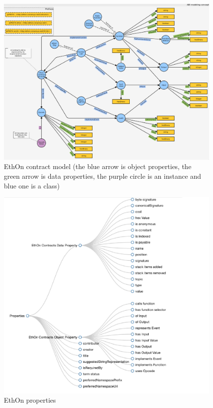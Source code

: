 \begin{center}
	
	\begin{figure}[htb!]
		
		\begin{minipage}{0.50\linewidth}
			\centering
			\includegraphics[width=1.80\textwidth]{images/chap2_EthOnContract.png}
		\end{minipage}
		\caption[EthOn classes]{EthOn contract model (the blue arrow is object properties, the green arrow is data properties, the purple circle is an instance and blue one is a class) \cite{Rashid}}
		
	\end{figure}
	
	\begin{figure}[htb!]
		
		\begin{minipage}{0.55\linewidth}
			\centering
			\includegraphics[width=1.65\textwidth]{images/chap02_EthOn_Properties.png}
		\end{minipage}
		\caption[EthOn properties]{EthOn properties \cite{Rashid}}
		

\end{figure}
\end{center}
